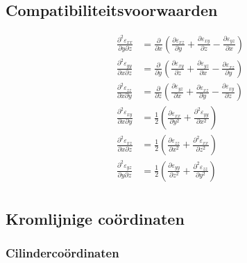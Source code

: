         \subsection{Compatibiliteitsvoorwaarden}

            \begin{align}
                \frac{\partial^2\varepsilon_{xx}}{\partial y\partial z} &= \frac{\partial}{\partial x} \left(\frac{\partial\varepsilon_{xz}}{\partial y} + \frac{\partial \varepsilon_{xy}}{\partial z} - \frac{\partial \varepsilon_{yz}}{\partial x}\right)\nonumber\\
                \frac{\partial^2\varepsilon_{yy}}{\partial x\partial z} &= \frac{\partial}{\partial y} \left(\frac{\partial\varepsilon_{xy}}{\partial z} + \frac{\partial \varepsilon_{yz}}{\partial x} - \frac{\partial \varepsilon_{xz}}{\partial y}\right)\nonumber\\
                \frac{\partial^2\varepsilon_{zz}}{\partial x\partial y} &= \frac{\partial}{\partial z} \left(\frac{\partial\varepsilon_{yz}}{\partial x} + \frac{\partial \varepsilon_{xz}}{\partial y} - \frac{\partial \varepsilon_{xy}}{\partial z}\right)\nonumber\\
                \frac{\partial^2\varepsilon_{xy}}{\partial x\partial y} &= \frac{1}{2} \left(\frac{\partial\varepsilon_{xx}}{\partial y^2} + \frac{\partial^2 \varepsilon_{yy}}{\partial x^2}\right)\nonumber\\
                \frac{\partial^2\varepsilon_{xz}}{\partial x\partial z} &= \frac{1}{2} \left(\frac{\partial\varepsilon_{zz}}{\partial x^2} + \frac{\partial^2 \varepsilon_{xx}}{\partial z^2}\right)\nonumber\\
                \frac{\partial^2\varepsilon_{yz}}{\partial y\partial z} &= \frac{1}{2} \left(\frac{\partial\varepsilon_{yy}}{\partial z^2} + \frac{\partial^2 \varepsilon_{zz}}{\partial y^2}\right)\nonumber\\
                \label{compatibiliteitsvoorwarden}
            \end{align}

       \subsection{Kromlijnige coördinaten}     

            \subsubsection{Cilindercoördinaten}

